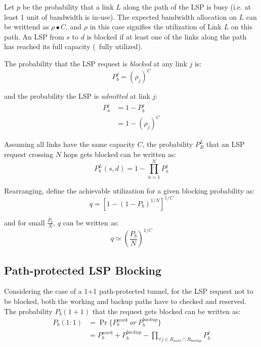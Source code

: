 Let $p$ be the probability that a link $L$ along the path of the LSP is busy (i.e. at least 1 unit of bandwidth is in-use). The expected bandwidth allocation on $L$ can be writtend as $\rho \bullet C$, and $\rho$ in this case signifies the utilization of Link $L$ on this path. An LSP from $s$ to $d$ is blocked if at least one of the links along the path has reached its full capacity (\ie\ fully utilized).

The probability that the LSP request is \emph{blocked} at any link $j$ is:
\begin{equation}
P_b^j = \left( \rho_j \right) ^C
\end{equation}

and the probability the LSP is \emph{admitted} at link $j$:
\begin{equation}
\begin{split}
P_a^j &= 1 - P_b^{j} \\
	  	&= 1 - \left( \rho_{j}\right) ^{C}
\end{split}
\end{equation}

Assuming all links have the same capacity $C$, the probability $P_B^L$ that an LSP request crossing $N$ hops gets blocked can be written as:
\begin{equation}
P_b^L(s,d) = 1-\prod_{n=1}^{N} P_{a}^j
\end{equation}

Rearranging, define the achievable utilization for a given blocking probability as:
\begin{equation}
q=\left[ 1 - (1 - P_b)^{1/N} \right]^{1/C}
\end{equation}	

and for small $\frac{P_b}{N}$, $q$ can be written as: 
\begin{equation}
q \simeq \left( \dfrac{P_b}{N} \right)^{1/C}
\end{equation}

\subsection{Path-protected LSP Blocking}
Considering the case of a 1+1 path-protected tunnel, for the LSP request not to be blocked, both the working and backup paths have to checked and reserved. The probability $P_b(1+1)$ that the request gets blocked can be written as:
\begin{equation}
\begin{split}
P_b(1:1) &= \Pr\{P_b^{work}~or~P_b^{backup}\} \\
		  &= P_b^{work} +  P_b^{backup} - \prod_{\forall j \in R_{work} \cap R_{backup}} P_b^j
\end{split}
\end{equation}


